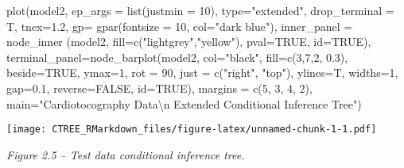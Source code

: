 \documentclass[
]{article}
\newenvironment{Shaded}{\begin{snugshade}}{\end{snugshade}}
\newcommand{\AttributeTok}[1]{\textcolor[rgb]{0.77,0.63,0.00}{#1}}
\newcommand{\ConstantTok}[1]{\textcolor[rgb]{0.00,0.00,0.00}{#1}}
\newcommand{\DecValTok}[1]{\textcolor[rgb]{0.00,0.00,0.81}{#1}}
\newcommand{\FloatTok}[1]{\textcolor[rgb]{0.00,0.00,0.81}{#1}}
\newcommand{\FunctionTok}[1]{\textcolor[rgb]{0.00,0.00,0.00}{#1}}
\newcommand{\NormalTok}[1]{#1}
\newcommand{\SpecialCharTok}[1]{\textcolor[rgb]{0.00,0.00,0.00}{#1}}
\newcommand{\StringTok}[1]{\textcolor[rgb]{0.31,0.60,0.02}{#1}}
\begin{document}
\begin{Shaded}
\begin{Highlighting}[]
\FunctionTok{plot}\NormalTok{(model2, }\AttributeTok{ep\_args =} \FunctionTok{list}\NormalTok{(}\AttributeTok{justmin =} \DecValTok{10}\NormalTok{), }\AttributeTok{type=}\StringTok{"extended"}\NormalTok{, }\AttributeTok{drop\_terminal =}\NormalTok{ T, }
     \AttributeTok{tnex=}\FloatTok{1.2}\NormalTok{, }\AttributeTok{gp=} \FunctionTok{gpar}\NormalTok{(}\AttributeTok{fontsize =} \DecValTok{10}\NormalTok{, }\AttributeTok{col=}\StringTok{"dark blue"}\NormalTok{), }
     \AttributeTok{inner\_panel =} \FunctionTok{node\_inner}\NormalTok{ (model2, }\AttributeTok{fill=}\FunctionTok{c}\NormalTok{(}\StringTok{"lightgrey"}\NormalTok{,}\StringTok{"yellow"}\NormalTok{), }\AttributeTok{pval=}\ConstantTok{TRUE}\NormalTok{, }\AttributeTok{id=}\ConstantTok{TRUE}\NormalTok{),}
     \AttributeTok{terminal\_panel=}\FunctionTok{node\_barplot}\NormalTok{(model2, }\AttributeTok{col=}\StringTok{"black"}\NormalTok{, }\AttributeTok{fill=}\FunctionTok{c}\NormalTok{(}\DecValTok{3}\NormalTok{,}\DecValTok{7}\NormalTok{,}\DecValTok{2}\NormalTok{, }\FloatTok{0.3}\NormalTok{), }\AttributeTok{beside=}\ConstantTok{TRUE}\NormalTok{, }
     \AttributeTok{ymax=}\DecValTok{1}\NormalTok{, }\AttributeTok{rot =} \DecValTok{90}\NormalTok{, }\AttributeTok{just =} \FunctionTok{c}\NormalTok{(}\StringTok{"right"}\NormalTok{, }\StringTok{"top"}\NormalTok{), }\AttributeTok{ylines=}\NormalTok{T, }
     \AttributeTok{widths=}\DecValTok{1}\NormalTok{, }\AttributeTok{gap=}\FloatTok{0.1}\NormalTok{, }\AttributeTok{reverse=}\ConstantTok{FALSE}\NormalTok{, }\AttributeTok{id=}\ConstantTok{TRUE}\NormalTok{), }\AttributeTok{margins =} \FunctionTok{c}\NormalTok{(}\DecValTok{5}\NormalTok{, }\DecValTok{3}\NormalTok{, }\DecValTok{4}\NormalTok{, }\DecValTok{2}\NormalTok{), }
     \AttributeTok{main=}\StringTok{"Cardiotocography Data}\SpecialCharTok{\textbackslash{}n}\StringTok{ Extended Conditional Inference Tree"}\NormalTok{)}
\end{Highlighting}
\end{Shaded}

\texttt{[image: CTREE\_RMarkdown\_files/figure-latex/unnamed-chunk-1-1.pdf]}

\emph{Figure 2.5 -- Test data conditional inference tree.}
\end{document}
